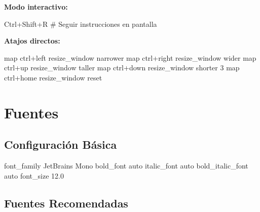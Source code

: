 \documentclass[
  doc,
  floatsintext,
  longtable,
  a4paper,
  nolmodern,
  notxfonts,
  notimes,
  12pt,
  colorlinks=true,linkcolor=blue,citecolor=blue,urlcolor=blue]{apa7}
\newenvironment{Shaded}{\begin{snugshade}}{\end{snugshade}}
\newcommand{\CommentTok}[1]{\textcolor[rgb]{0.37,0.37,0.37}{#1}}
\newcommand{\DataTypeTok}[1]{\textcolor[rgb]{0.68,0.00,0.00}{#1}}
\newcommand{\ErrorTok}[1]{\textcolor[rgb]{0.68,0.00,0.00}{#1}}
\newcommand{\ExtensionTok}[1]{\textcolor[rgb]{0.00,0.23,0.31}{#1}}
\begin{document}
\textbf{Modo interactivo:}

\begin{Shaded}
\begin{Highlighting}[]
\ExtensionTok{Ctrl+Shift+R}
\CommentTok{\# Seguir instrucciones en pantalla}
\end{Highlighting}
\end{Shaded}

\textbf{Atajos directos:}

\begin{Shaded}
\begin{Highlighting}[]
\DataTypeTok{map} \DataTypeTok{ctrl}\ErrorTok{+}\DataTypeTok{left} \DataTypeTok{resize\_window} \DataTypeTok{narrower}
\DataTypeTok{map} \DataTypeTok{ctrl}\ErrorTok{+}\DataTypeTok{right} \DataTypeTok{resize\_window} \DataTypeTok{wider}
\DataTypeTok{map} \DataTypeTok{ctrl}\ErrorTok{+}\DataTypeTok{up} \DataTypeTok{resize\_window} \DataTypeTok{taller}
\DataTypeTok{map} \DataTypeTok{ctrl}\ErrorTok{+}\DataTypeTok{down} \DataTypeTok{resize\_window} \DataTypeTok{shorter} \DataTypeTok{3}
\DataTypeTok{map} \DataTypeTok{ctrl}\ErrorTok{+}\DataTypeTok{home} \DataTypeTok{resize\_window} \DataTypeTok{reset}
\end{Highlighting}
\end{Shaded}

\section{Fuentes}\label{fuentes-1}

\subsection{Configuración Básica}\label{configuraciuxf3n-buxe1sica}

\begin{Shaded}
\begin{Highlighting}[]
\DataTypeTok{font\_family}      \DataTypeTok{JetBrains} \DataTypeTok{Mono}
\DataTypeTok{bold\_font}        \DataTypeTok{auto}
\DataTypeTok{italic\_font}      \DataTypeTok{auto}
\DataTypeTok{bold\_italic\_font} \DataTypeTok{auto}
\DataTypeTok{font\_size}        \DataTypeTok{12.0}
\end{Highlighting}
\end{Shaded}

\subsection{Fuentes Recomendadas}\label{fuentes-recomendadas}
\end{document}
